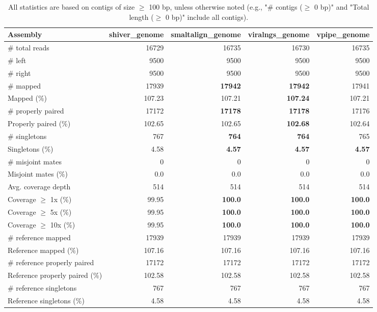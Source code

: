 \documentclass[12pt,a4paper]{article}
\begin{document}
\begin{table}[ht]
\begin{center}
\caption{All statistics are based on contigs of size $\geq$ 100 bp, unless otherwise noted (e.g., "\# contigs ($\geq$ 0 bp)" and "Total length ($\geq$ 0 bp)" include all contigs).}
\begin{tabular}{|l*{4}{|r}|}
\hline
Assembly & shiver\_genome & smaltalign\_genome & viralngs\_genome & vpipe\_genome \\ \hline
\# total reads & 16729 & 16735 & 16730 & 16735 \\ \hline
\# left & 9500 & 9500 & 9500 & 9500 \\ \hline
\# right & 9500 & 9500 & 9500 & 9500 \\ \hline
\# mapped & 17939 & {\bf 17942} & {\bf 17942} & 17941 \\ \hline
Mapped (\%) & 107.23 & 107.21 & {\bf 107.24} & 107.21 \\ \hline
\# properly paired & 17172 & {\bf 17178} & {\bf 17178} & 17176 \\ \hline
Properly paired (\%) & 102.65 & 102.65 & {\bf 102.68} & 102.64 \\ \hline
\# singletons & 767 & {\bf 764} & {\bf 764} & 765 \\ \hline
Singletons (\%) & 4.58 & {\bf 4.57} & {\bf 4.57} & {\bf 4.57} \\ \hline
\# misjoint mates & 0 & 0 & 0 & 0 \\ \hline
Misjoint mates (\%) & 0.0 & 0.0 & 0.0 & 0.0 \\ \hline
Avg. coverage depth & 514 & 514 & 514 & 514 \\ \hline
Coverage $\geq$ 1x (\%) & 99.95 & {\bf 100.0} & {\bf 100.0} & {\bf 100.0} \\ \hline
Coverage $\geq$ 5x (\%) & 99.95 & {\bf 100.0} & {\bf 100.0} & {\bf 100.0} \\ \hline
Coverage $\geq$ 10x (\%) & 99.95 & {\bf 100.0} & {\bf 100.0} & {\bf 100.0} \\ \hline
\# reference mapped & 17939 & 17939 & 17939 & 17939 \\ \hline
Reference mapped (\%) & 107.16 & 107.16 & 107.16 & 107.16 \\ \hline
\# reference properly paired & 17172 & 17172 & 17172 & 17172 \\ \hline
Reference properly paired (\%) & 102.58 & 102.58 & 102.58 & 102.58 \\ \hline
\# reference singletons & 767 & 767 & 767 & 767 \\ \hline
Reference singletons (\%) & 4.58 & 4.58 & 4.58 & 4.58 \\ \hline

\end{tabular}
\end{center}
\end{table}
\end{document}
